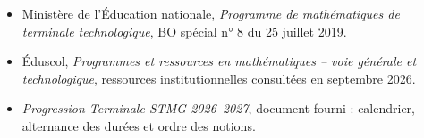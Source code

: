 \begin{itemize}
\item Ministère de l'Éducation nationale, \emph{Programme de mathématiques de terminale technologique}, BO spécial n° 8 du 25 juillet 2019.
\item Éduscol, \emph{Programmes et ressources en mathématiques -- voie générale et technologique}, ressources institutionnelles consultées en septembre 2026.
\item \emph{Progression Terminale STMG 2026--2027}, document fourni : calendrier, alternance des durées et ordre des notions.
\end{itemize}
